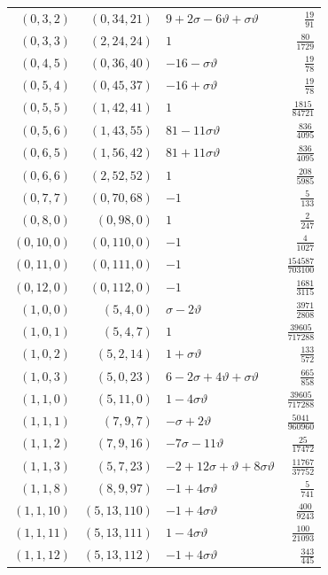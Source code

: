 \begin{longtable}{rrlr}
$(0,3,2)$ & $(0,34,21)$ & $9+2\sigma-6\vartheta+\sigma\vartheta$ & $\frac{19}{91}$\\
$(0,3,3)$ & $(2,24,24)$ & $1$ & $\frac{80}{1729}$\\
$(0,4,5)$ & $(0,36,40)$ & $-16-\sigma\vartheta$ & $\frac{19}{78}$\\
$(0,5,4)$ & $(0,45,37)$ & $-16+\sigma\vartheta$ & $\frac{19}{78}$\\
$(0,5,5)$ & $(1,42,41)$ & $1$ & $\frac{1815}{84721}$\\
$(0,5,6)$ & $(1,43,55)$ & $81-11\sigma\vartheta$ & $\frac{836}{4095}$\\
$(0,6,5)$ & $(1,56,42)$ & $81+11\sigma\vartheta$ & $\frac{836}{4095}$\\
$(0,6,6)$ & $(2,52,52)$ & $1$ & $\frac{208}{5985}$\\
$(0,7,7)$ & $(0,70,68)$ & $-1$ & $\frac{5}{133}$\\
$(0,8,0)$ & $(0,98,0)$ & $1$ & $\frac{2}{247}$\\
$(0,10,0)$ & $(0,110,0)$ & $-1$ & $\frac{4}{1027}$\\
$(0,11,0)$ & $(0,111,0)$ & $-1$ & $\frac{154587}{703100}$\\
$(0,12,0)$ & $(0,112,0)$ & $-1$ & $\frac{1681}{3115}$\\
$(1,0,0)$ & $(5,4,0)$ & $\sigma-2\vartheta$ & $\frac{3971}{2808}$\\
$(1,0,1)$ & $(5,4,7)$ & $1$ & $\frac{39605}{717288}$\\
$(1,0,2)$ & $(5,2,14)$ & $1+\sigma\vartheta$ & $\frac{133}{572}$\\
$(1,0,3)$ & $(5,0,23)$ & $6-2\sigma+4\vartheta+\sigma\vartheta$ & $\frac{665}{858}$\\
$(1,1,0)$ & $(5,11,0)$ & $1-4\sigma\vartheta$ & $\frac{39605}{717288}$\\
$(1,1,1)$ & $(7,9,7)$ & $-\sigma+2\vartheta$ & $\frac{5041}{960960}$\\
$(1,1,2)$ & $(7,9,16)$ & $-7\sigma-11\vartheta$ & $\frac{25}{17472}$\\
$(1,1,3)$ & $(5,7,23)$ & $-2+12\sigma+\vartheta+8\sigma\vartheta$ & $\frac{11767}{37752}$\\
$(1,1,8)$ & $(8,9,97)$ & $-1+4\sigma\vartheta$ & $\frac{5}{741}$\\
$(1,1,10)$ & $(5,13,110)$ & $-1+4\sigma\vartheta$ & $\frac{400}{9243}$\\
$(1,1,11)$ & $(5,13,111)$ & $1-4\sigma\vartheta$ & $\frac{100}{21093}$\\
$(1,1,12)$ & $(5,13,112)$ & $-1+4\sigma\vartheta$ & $\frac{343}{445}$\\

\end{longtable}
